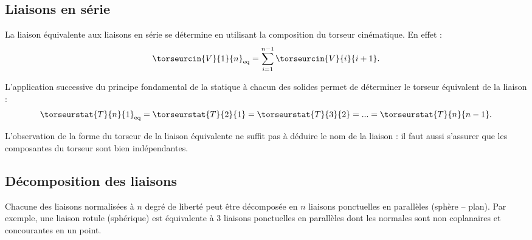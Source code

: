 \subsection{Liaisons en série}
\begin{methode}
La liaison équivalente aux liaisons en série se détermine en utilisant la composition du torseur cinématique. En effet : 
$$
\torseurcin{V}{1}{n}_{\text{eq}} = \sum\limits_{i=1}^{n-1}\torseurcin{V}{i}{i+1}.
$$ 
\end{methode}

\begin{remarque}
L'application successive du principe fondamental de la statique à chacun des solides permet de déterminer le torseur équivalent de la liaison : 
$$
\torseurstat{T}{n}{1}_{\text{eq}} = 
\torseurstat{T}{2}{1} = 
\torseurstat{T}{3}{2} =
...
=\torseurstat{T}{n}{n-1}.
$$ 
\end{remarque}

\begin{warn}
L'observation de la forme du torseur de la liaison équivalente ne suffit pas à déduire le nom de la liaison : il faut aussi s'assurer que les composantes du torseur sont bien indépendantes. 
\end{warn}

\subsection{Décomposition des liaisons}
Chacune des liaisons normalisées à $n$ degré de liberté peut être décomposée en $n$ liaisons ponctuelles en parallèles (sphère -- plan). Par exemple, une liaison rotule (sphérique) est équivalente à 3 liaisons ponctuelles en parallèles dont les normales sont non coplanaires et concourantes en un point.